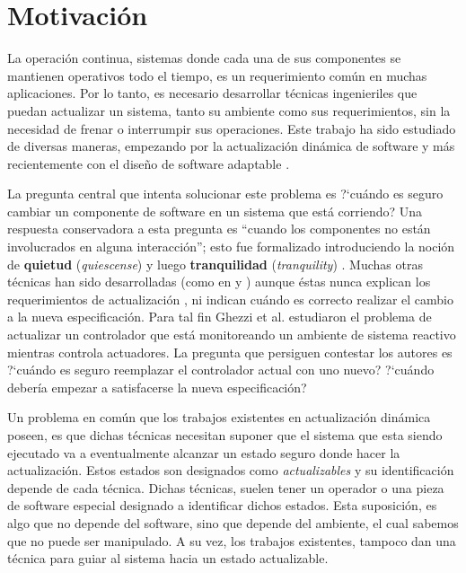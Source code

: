 \section{Motivación}

La operación continua, sistemas donde cada una de sus componentes se mantienen operativos todo el tiempo, es un
requerimiento común en muchas aplicaciones. Por lo tanto, es necesario desarrollar técnicas ingenieriles que puedan
actualizar un sistema, tanto su ambiente como sus requerimientos, sin la necesidad de frenar o interrumpir sus
operaciones. Este trabajo ha sido estudiado de diversas maneras, empezando por la actualización dinámica de software
\cite{60317} y más recientemente con el diseño de software adaptable \cite{SEAMS}.

La pregunta central que intenta solucionar este problema es ?`cuándo es seguro cambiar un componente de software en un sistema
que está corriendo? Una respuesta conservadora a esta pregunta es ``cuando los componentes no están involucrados en
alguna interacción''; esto fue formalizado introduciendo la noción de \textbf{quietud} (\emph{quiescense}) \cite{60317} y luego
\textbf{tranquilidad} (\emph{tranquility}) \cite{4359466}. Muchas otras técnicas han sido desarrolladas (como en
\cite{Anderson:2009:MPM:1656437.1656448} y \cite{485222}) aunque éstas nunca explican los requerimientos de
actualización \cite{Baresi:2010:DBD:1882362.1882367}, ni indican cuándo es correcto realizar el cambio a la nueva especificación.
Para tal fin Ghezzi et al. \cite{6224401,PanzicaLaManna:2013:FCC:2487336.2487349} estudiaron el problema de actualizar un
controlador que está monitoreando un ambiente de sistema reactivo mientras controla actuadores. La pregunta que persiguen
contestar los autores es ?`cuándo es seguro reemplazar el controlador actual con uno nuevo? ?`cuándo debería empezar a satisfacerse la nueva
especificación?

Un problema en común que los trabajos existentes en actualización dinámica poseen, es que dichas técnicas necesitan
suponer que el sistema que esta siendo ejecutado va a eventualmente alcanzar un estado seguro donde hacer la
actualización. Estos estados son designados como \emph{actualizables} y su identificación depende de cada técnica.
Dichas técnicas, suelen tener un operador o una pieza de software especial designado a identificar dichos estados. Esta suposición, es algo
que no depende del software, sino que depende del ambiente, el cual sabemos que no puede ser manipulado. A su vez, los trabajos
existentes, tampoco dan una técnica para guiar al sistema hacia un estado actualizable. 

